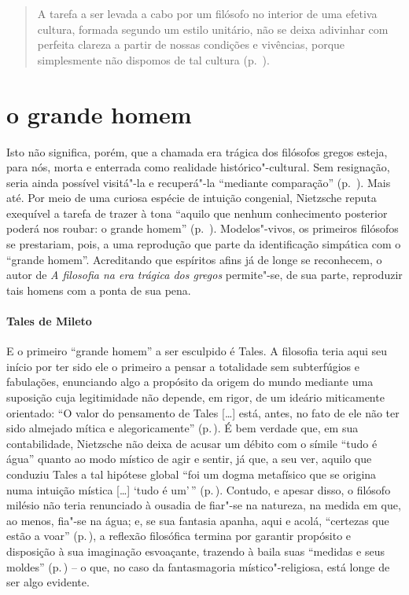 \begin{quote} 
A tarefa a ser levada a cabo por um filósofo no interior de
 uma efetiva cultura, formada segundo um estilo unitário, não se deixa
 adivinhar com perfeita clareza a partir de nossas condições e vivências,
 porque simplesmente não dispomos de tal cultura (p.~\pageref{tarefaaserlevada}).
\end{quote} 

\section{o grande homem} 

Isto não significa, porém, que a chamada era trágica dos filósofos gregos 
esteja, para nós, morta e enterrada como realidade
 histórico"-cultural. Sem resignação, seria ainda possível visitá"-la e
 recuperá"-la ``mediante comparação'' (p.~\pageref{comparacao}). Mais até.
 Por meio de uma curiosa espécie de intuição congenial, Nietzsche reputa
 exequível a tarefa de trazer à tona ``aquilo que nenhum conhecimento
 posterior poderá nos roubar: o grande homem'' (p.~\pageref{ograndehomem}). 
 Modelos"-vivos, os primeiros filósofos se prestariam, pois,
 a uma reprodução que parte da identificação simpática com o ``grande
 homem''. Acreditando que espíritos afins já de longe se reconhecem, o autor
 de \textit{A filosofia na era trágica dos gregos} permite"-se, de sua parte,
 reproduzir tais homens com a ponta de sua pena.

\paragraph{Tales de Mileto} E o primeiro ``grande homem'' a ser esculpido é
 Tales. A filosofia teria aqui seu início por ter sido ele o primeiro a
 pensar a totalidade sem subterfúgios e fabulações, enunciando algo a
 propósito da origem do mundo mediante uma suposição cuja legitimidade não
 depende, em rigor, de um ideário miticamente orientado: ``O valor do
 pensamento de Tales [\ldots] está, antes, no fato de ele não ter sido
 almejado mítica e alegoricamente'' (p.\,\pageref{pensamentodetales}). É bem
 verdade que, em sua contabilidade, Nietzsche não deixa de acusar um débito
 com o símile ``tudo é água'' quanto ao modo místico de agir e sentir, já
 que, a seu ver, aquilo que conduziu Tales a tal hipótese global ``foi um
 dogma metafísico que se origina numa intuição mística [\ldots] `tudo é
 um'\,'' (p.\,\pageref{foiumdogma}). Contudo, e apesar disso, o filósofo
 milésio não teria renunciado à ousadia de fiar"-se na natureza, na medida em
 que, ao menos, fia"-se na água; e, se sua fantasia apanha, aqui e acolá,
 ``certezas que estão a voar'' (p.\,\pageref{certezasque}), a reflexão
 filosófica termina por garantir propósito e disposição à sua imaginação
 esvoaçante, trazendo à baila suas ``medidas e seus moldes'' 
 (p.\,\pageref{medidaseseusmoldes}) -- o que, no caso da fantasmagoria místico"-religiosa,
 está longe de ser algo evidente.


